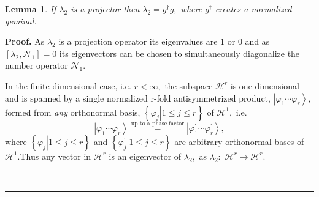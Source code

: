 \documentclass[aps,preprint,amsfonts,amssymb,showpacs,showkeys]{revtex4}%
\newtheorem{lemma}[theorem]{Lemma}
\newenvironment{proof}[1][Proof]{\noindent\textbf{#1.} }{\ \rule{0.5em}{0.5em}}
\begin{document}
\begin{lemma}
If $\lambda_{2}$ is a projector then $\lambda_{2}=g^{\dagger}g,$ where
$g^{\dagger}$ creates a normalized geminal.
\end{lemma}

\begin{proof}
As $\lambda_{2}$ is a projection operator its eigenvalues are $1$ or $0$ and
as $\left[  \lambda_{2},\mathcal{N}_{1}\right]  =0$ its eigenvectors can be
chosen to simultaneously diagonalize the number operator $\mathcal{N}_{1}.$

In the finite dimensional case, i.e. $r<\infty,$ the subspace $\mathcal{H}%
^{r}$ is one dimensional and is spanned by a single normalized r-fold\emph{
}antisymmetrized product, $\left\vert \varphi_{1}\cdots\varphi_{r}%
\right\rangle ,$ formed from \emph{any }orthonormal basis, $\left\{  \left.
\varphi_{j}\right\vert 1\leq j\leq r\right\}  $ of $\mathcal{H}^{1},$ i.e.
\begin{equation}
\left\vert \varphi_{1}\cdots\varphi_{r}\right\rangle \overset{\text{up to a
phase factor}}{=}\left\vert \varphi_{1}^{\prime}\cdots\varphi_{r}^{\prime
}\right\rangle ,
\end{equation}
where $\left\{  \left.  \varphi_{j}\right\vert 1\leq j\leq r\right\}  $ and
$\left\{  \left.  \varphi_{j}^{\prime}\right\vert 1\leq j\leq r\right\}  $ are
arbitrary orthonormal bases of $\mathcal{H}^{1}.$Thus any vector in
$\mathcal{H}^{r}$ is an eigenvector of $\lambda_{2},$ as $\lambda_{2}:$
$\mathcal{H}^{r}\rightarrow\mathcal{H}^{r}$.


\end{proof}
\end{document}
